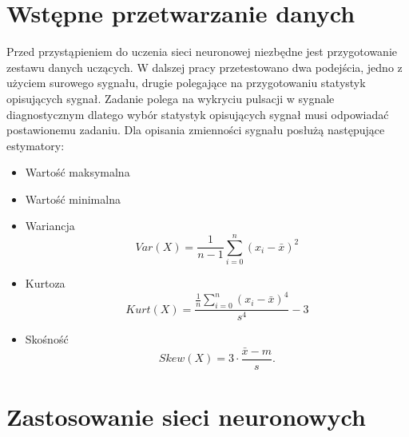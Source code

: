 \documentclass[inzynierska]{pwr_wmat_praca_dyplomowa}
\theoremstyle{plain}
\numberwithin{theorem}{chapter}
\theoremstyle{definition}
\numberwithin{theorem}{chapter}
\begin{document}
\section{Wstępne przetwarzanie danych}
Przed przystąpieniem do uczenia sieci neuronowej niezbędne jest przygotowanie zestawu danych uczących. W dalszej pracy przetestowano dwa podejścia, jedno z użyciem surowego sygnału, drugie polegające na przygotowaniu statystyk opisujących sygnał. Zadanie polega na wykryciu pulsacji w sygnale diagnostycznym dlatego wybór statystyk opisujących sygnał musi odpowiadać postawionemu zadaniu. Dla opisania zmienności sygnału posłużą następujące estymatory:
\begin{itemize}
	\item Wartość maksymalna
	\item Wartość minimalna
	\item Wariancja
	\begin{equation}
	Var (X) = \frac{1}{n-1} \sum_{i=0}^{n} \left(x_{i} - \bar{x}\right)^{2}
	\end{equation}
	\item Kurtoza
	\begin{equation}
	Kurt (X) = \frac{\frac{1}{n} \sum_{i=0}^{n}\left(x_{i} - \bar{x}\right)^{4}}{s^{4}} - 3
	\end{equation}
	\item Skośność
	\begin{equation}
	Skew (X) = 3 \cdot \frac{\bar{x} - m}{s}.
	\end{equation}
\end{itemize}



\section{Zastosowanie sieci neuronowych}
\end{document}
